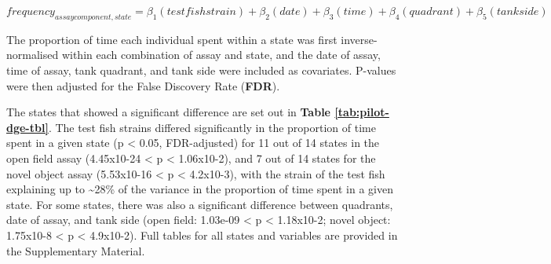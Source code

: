 \documentclass[
]{book}
\begin{document}
\[
frequency_{assay component,state} = \beta_{1}(test fish strain) + \beta_{2}(date) + \beta_{3}(time) + \beta_{4}(quadrant) + \beta_{5}(tank side)
\]

The proportion of time each individual spent within a state was first inverse-normalised within each combination of assay and state, and the date of assay, time of assay, tank quadrant, and tank side were included as covariates. P-values were then adjusted for the False Discovery Rate (\textbf{FDR}).

The states that showed a significant difference are set out in \textbf{Table \ref{tab:pilot-dge-tbl}}. The test fish strains differed significantly in the proportion of time spent in a given state (p \textless{} 0.05, FDR-adjusted) for 11 out of 14 states in the open field assay (4.45x10-24 \textless{} p \textless{} 1.06x10-2), and 7 out of 14 states for the novel object assay (5.53x10-16 \textless{} p \textless{} 4.2x10-3), with the strain of the test fish explaining up to \textasciitilde28\% of the variance in the proportion of time spent in a given state. For some states, there was also a significant difference between quadrants, date of assay, and tank side (open field: 1.03e-09 \textless{} p \textless{} 1.18x10-2; novel object: 1.75x10-8 \textless{} p \textless{} 4.9x10-2). Full tables for all states and variables are provided in the Supplementary Material.
\end{document}
